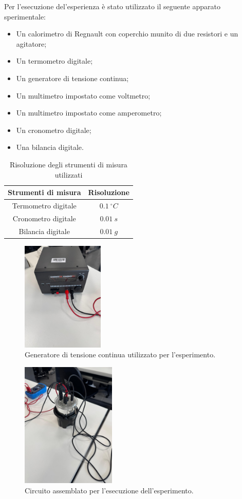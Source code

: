 Per l'esecuzione del'esperienza è stato utilizzato il seguente apparato sperimentale:
\begin{itemize}
	\item Un calorimetro di Regnault con coperchio munito di due resistori e un agitatore;
	\item Un termometro digitale;
	\item Un generatore di tensione continua;
	\item Un multimetro impostato come voltmetro;
	\item Un multimetro impostato come amperometro;
	\item Un cronometro digitale;
	\item Una bilancia digitale.
\end{itemize}

\begin{table}[H]
	\centering
	\begin{tabular}{|c|c|}
		\hline
		\textbf{Strumenti di misura} & \textbf{Risoluzione} \\
		\hline
		Termometro digitale & $0.1\ ^{\circ}C$ \\
		\hline
		Cronometro digitale & $0.01\ s$ \\
		\hline
		Bilancia digitale & $0.01\ g$ \\
		\hline
	\end{tabular}
	\caption{Risoluzione degli strumenti di misura utilizzati}
	\label{tab:}
\end{table}

\begin{figure}[H]
	\centering
	\includegraphics[width=0.35\textwidth]{./figures/generatore}
	\caption{Generatore di tensione continua utilizzato per l'esperimento.}
\end{figure}

\begin{figure}[H]
	\centering
	\includegraphics[width=0.4\textwidth]{./figures/calorimetro}
	\caption{Circuito assemblato per l'esecuzione dell'esperimento.}
\end{figure}


